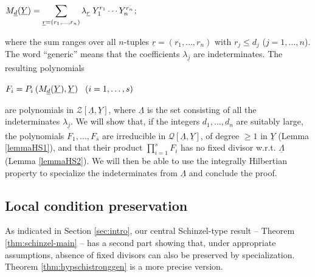 \documentclass[11pt,a4paper,reqno]{amsart}
\def\Z{\mathbb{Z}}
\theoremstyle{definition}
\begin{document}
\centerline{$\displaystyle M_{{\underline d}}(\underline Y) = \sum_{\underline r=(r_1,\ldots,r_n)} \lambda_{\underline r} \hskip 1mm Y_1^{r_1} \cdots Y_n^{r_n}$;}
\vskip 1mm

\noindent
where the sum ranges over all $n$-tuples $\underline r=(r_1,\ldots,r_n)$ with $r_j\leq d_{j}$ ($j=1,\ldots,n$). The word ``generic'' means that the coefficients $\lambda_{\underline j}$ are indeterminates. 
The resulting polynomials
\vskip 1mm

\centerline{$F_i = P_i\hskip 2pt (M_{{\underline d}}(\underline Y),\underline{Y})\hskip 3mm (i=1,\ldots,s)$}
\vskip 1mm

\noindent
are polynomials in ${\mathcal Z}[\underline \Lambda, \underline Y]$, where $\underline \Lambda$ is the set consisting of all the indeterminates $\lambda_{\underline j}$. We will show that, if the integers $d_1,\ldots,d_n$ are suitably large,
the polynomials $F_1,\ldots, F_s$ are irreducible in ${\mathcal Q}[\underline \Lambda,\underline Y]$, of degree $\geq 1$ in $\underline Y$ (Lemma \ref{lemmaHS1}), and that their product $\prod_{i=1}^s F_i$ has no fixed divisor \hbox{w.r.t.} $\underline{\Lambda}$ (Lemma \ref{lemmaHS2}). We will then be able to use the integrally Hilbertian property to specialize the indeterminates from $\underline{\Lambda}$ and conclude the proof.






\subsection{Local condition preservation} \label{ssec:hypschistronggen}
As indicated in Section \ref{sec:intro}, our central Schinzel-type result -- Theorem \ref{thm:schinzel-main} -- has a second part showing that, under appropriate assumptions, absence of fixed divisors can also be preserved by specialization. Theorem \ref{thm:hypschistronggen} is a more precise version.
\end{document}
